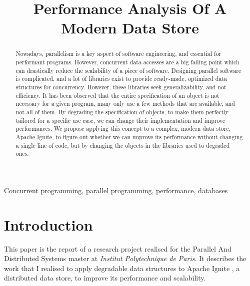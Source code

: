 \documentclass[conference]{IEEEtran}
\begin{document}
\title{Performance Analysis Of A Modern Data Store}

\author{
}

\maketitle
\thispagestyle{plain}
\pagestyle{plain}

\begin{abstract}
Nowadays, parallelism is a key aspect of software engineering, and essential for performant programs. However, concurrent data accesses are a big failing point which can drastically reduce the scalability of a piece of software. Designing parallel software is complicated, and a lot of libraries exist to provide ready-made, optimized data structures for concurrency. However, these libraries seek generalizability, and not efficiency. It has been observed that the entire specification of an object is not necessary for a given program, many only use a few methods that are available, and not all of them. By degrading the specification of objects, to make them perfectly tailored for a specific use case, we can change their implementation and improve performances. We propose applying this concept to a complex, modern data store, Apache Ignite, to figure out whether we can improve its performance without changing a single line of code, but by changing the objects in the libraries used to degraded ones.

\end{abstract}

\begin{IEEEkeywords}
Concurrent programming, parallel programming, performance, databases
\end{IEEEkeywords}

\bigbreak 

\section{Introduction}
This paper is the report of a research project realised for the Parallel And Distributed Systems master at \textit{Institut Polytechnique de Paris}. It describes the work that I realised to apply degradable data structures to Apache Ignite \cite{ignite}, a distributed data store, to improve its performance and scalability.
\end{document}
